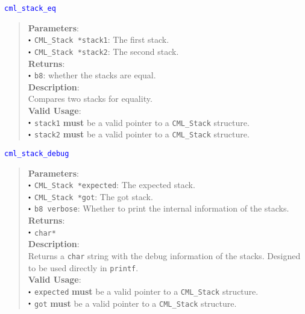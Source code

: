 \documentclass[a4paper,oneside,8pt]{extarticle}
\newcommand{\function}[1]{
  \noindent\textcolor{blue}{\texttt{#1}}
  \vspace{-0.3em}
}
\renewcommand{\dot}{\raisebox{0.3ex}{\scalebox{0.6}{$\bullet$}}}
\theoremstyle{definition}
\begin{document}
\function{cml\_stack\_eq}
\begin{quote}
  \textbf{Parameters}: \\
  $\dot$ \texttt{CML\_Stack *stack1}: The first stack. \\
  $\dot$ \texttt{CML\_Stack *stack2}: The second stack. \\
  \textbf{Returns}: \\
  $\dot$ \texttt{b8}: whether the stacks are equal. \\

  \vspace{-0.75em}
  \textbf{Description}: \\
  Compares two stacks for equality. \\

  \vspace{-0.75em}
  \textbf{Valid Usage}: \\
  $\dot$ \texttt{stack1} \textbf{must} be a valid pointer to a \texttt{CML\_Stack} structure. \\
  $\dot$ \texttt{stack2} \textbf{must} be a valid pointer to a \texttt{CML\_Stack} structure. \\
\end{quote}

\function{cml\_stack\_debug}
\begin{quote}
  \textbf{Parameters}: \\
  $\dot$ \texttt{CML\_Stack *expected}: The expected stack. \\
  $\dot$ \texttt{CML\_Stack *got}: The got stack. \\
  $\dot$ \texttt{b8 verbose}: Whether to print the internal information of the stacks. \\
  \textbf{Returns}: \\
  $\dot$ \texttt{char*} \\

  \vspace{-0.75em}
  \textbf{Description}: \\
  Returns a \texttt{char} string with the debug information of the stacks. Designed to be used directly in \texttt{printf}. \\
  
  \vspace{-0.75em}
  \textbf{Valid Usage}: \\
  $\dot$ \texttt{expected} \textbf{must} be a valid pointer to a \texttt{CML\_Stack} structure. \\
  $\dot$ \texttt{got} \textbf{must} be a valid pointer to a \texttt{CML\_Stack} structure. \\
\end{quote}
\end{document}

